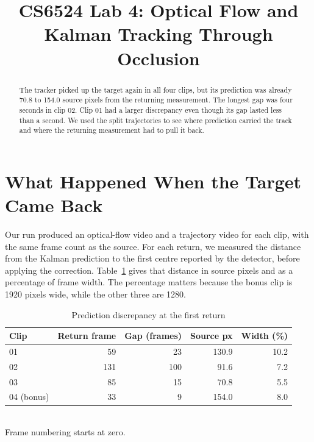\documentclass[conference]{assets/latex/IEEEtran}
\begin{document}
\title{CS6524 Lab 4: Optical Flow and Kalman Tracking Through Occlusion}
\author{
}
\maketitle

\begin{abstract}
The tracker picked up the target again in all four clips, but its
prediction was already 70.8 to 154.0 source pixels from the returning
measurement. The longest gap was four seconds in clip 02. Clip 01
had a larger discrepancy even though its gap lasted less than a second.
We used the split trajectories to see where prediction carried the track
and where the returning measurement had to pull it back.
\end{abstract}

\section{What Happened When the Target Came Back}

Our run produced an optical-flow video and a trajectory video for each
clip, with the same frame count as the source. For each return, we
measured the distance from the Kalman prediction to the first centre
reported by the detector, before applying the correction.
Table~\ref{tab:results} gives that distance in source pixels and
as a percentage of frame width. The percentage matters because the
bonus clip is 1920 pixels wide, while the other three are 1280.

\begin{table}[!h]
\caption{Prediction discrepancy at the first return}
\label{tab:results}
\centering
\begin{tabular}{lrrrr}
\hline
Clip & Return frame & Gap (frames) & Source px & Width (\%) \\
\hline
01 & 59  & 23  & 130.9 & 10.2 \\
02 & 131 & 100 & 91.6  & 7.2 \\
03 & 85  & 15  & 70.8  & 5.5 \\
04 (bonus) & 33 & 9 & 154.0 & 8.0 \\
\hline
\end{tabular}\\[2pt]
{\footnotesize Frame numbering starts at zero.}
\end{table}
\end{document}

